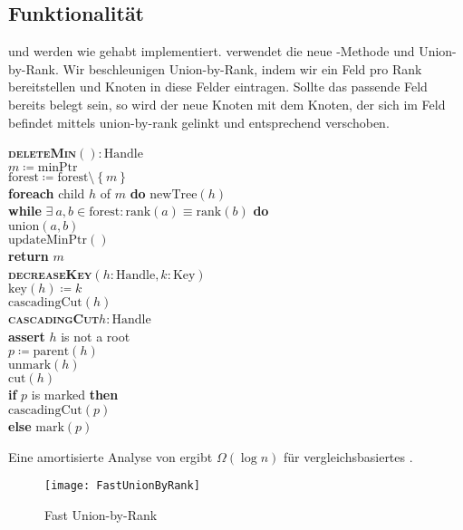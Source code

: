 \subsection{Funktionalität}

 und  werden wie gehabt implementiert.  verwendet die neue -Methode und  Union-by-Rank. Wir beschleunigen Union-by-Rank, indem wir ein Feld pro Rank bereitstellen und Knoten in diese Felder eintragen. Sollte das passende Feld bereits belegt sein, so wird der neue Knoten mit dem Knoten, der sich im Feld befindet mittels union-by-rank gelinkt und entsprechend verschoben.

\begin{minipage}{.625\textwidth}
  \begin{pseudocode}
    \textbf{\textsc{deleteMin}}\( () : \text{Handle} \) \\
    \phantom{\enskip} \( m \coloneqq \text{minPtr} \) \\
    \phantom{\enskip} \( \text{forest} \coloneqq \text{forest} \setminus \left \{ m \right \} \) \\
    \phantom{\enskip} \textbf{foreach} child \( h \) of \( m \) \textbf{do} \( \text{newTree}(h) \) \\
    \phantom{\enskip} \textbf{while} \( \exists \ a,b \in \text{forest} : \text{rank}(a) \equiv \text{rank}(b) \) \textbf{do} \\
    \phantom{\enskip} \phantom{\enskip} \( \text{union}(a,b) \) \\
    \phantom{\enskip} \( \text{updateMinPtr}() \) \\
    \phantom{\enskip} \textbf{return} \( m \) \\
    \textbf{\textsc{decreaseKey}}\( (h: \text{Handle}, k : \text{Key}) \) \\
    \phantom{\enskip} \( \text{key}(h) \coloneqq k \) \\
    \phantom{\enskip} \( \text{cascadingCut}(h) \) \\
    \textbf{\textsc{cascadingCut}}\( h : \text{Handle} \) \\
    \phantom{\enskip} \textbf{assert} \( h \) is not a root \\
    \phantom{\enskip} \( p \coloneqq \text{parent}(h) \) \\
    \phantom{\enskip} \( \text{unmark}(h) \) \\
    \phantom{\enskip} \( \text{cut}(h) \) \\
    \phantom{\enskip} \textbf{if} \( p \) is marked \textbf{then} \\
    \phantom{\enskip} \phantom{\enskip} \( \text{cascadingCut}(p) \) \\
    \phantom{\enskip} \textbf{else} \( \text{mark}(p) \)
  \end{pseudocode}
  
  Eine amortisierte Analyse von  ergibt \( \Omega(\log n) \) für vergleichsbasiertes .
\end{minipage}
\hfill
\begin{minipage}{.35\textwidth}
  \begin{figure}[H]
    \texttt{[image: FastUnionByRank]}
    \caption{Fast Union-by-Rank}
  \end{figure}
\end{minipage}